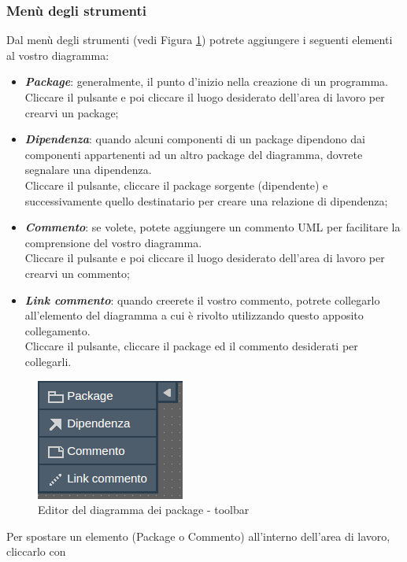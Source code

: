 \documentclass[../ManualeUtente.tex]{subfiles}
\begin{document}
			\subsubsection{Menù degli strumenti}
				Dal menù degli strumenti (vedi Figura \ref{fig:ToolbarPkgDiag}) potrete aggiungere i seguenti elementi
				al vostro diagramma:
				\begin{itemize}
					\item \textit{\textbf{Package}}: generalmente, il punto d'inizio nella creazione di un programma.\\
					Cliccare il pulsante e poi cliccare il luogo desiderato
					dell'area di lavoro per crearvi un package;
					\item \textit{\textbf{Dipendenza}}: quando alcuni componenti di un package dipendono dai componenti
					appartenenti ad un altro package del diagramma, dovrete segnalare una dipendenza.\\
					Cliccare il pulsante, cliccare il package sorgente
					(dipendente) e successivamente quello destinatario per creare una relazione di dipendenza;
					\item \textit{\textbf{Commento}}: se volete, potete aggiungere un commento UML per facilitare la
					comprensione del vostro diagramma.\\
					Cliccare il pulsante e poi cliccare il luogo desiderato
					dell'area di lavoro per crearvi un commento;
					\item \textit{\textbf{Link commento}}: quando creerete il vostro commento, potrete collegarlo
					all'elemento del diagramma a cui è rivolto utilizzando questo apposito collegamento.\\
					Cliccare il pulsante, cliccare il package ed il
					commento desiderati per collegarli.
				\end{itemize}
				\begin{figure} [h!]
					\centering
					\includegraphics[scale=0.5]{./Immagini/ToolbarPkgDiag.png}
					\caption{Editor del diagramma dei package - toolbar}\label{fig:ToolbarPkgDiag}
				\end{figure}
				Per spostare un elemento (Package o Commento) all'interno dell'area di lavoro, cliccarlo con
\end{document}
